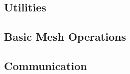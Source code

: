 
\subsection{Utilities}
\label{sec:utilities}


\subsection{Basic Mesh Operations}
\label{sec:mesh}


\subsection{Communication}
\label{sec:comm}



